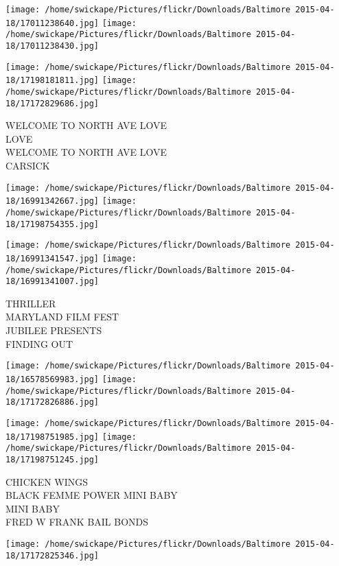 \documentclass[10pt,letterpaper]{article}
\begin{document}
\texttt{[image: /home/swickape/Pictures/flickr/Downloads/Baltimore 2015-04-18/17011238640.jpg]}
\texttt{[image: /home/swickape/Pictures/flickr/Downloads/Baltimore 2015-04-18/17011238430.jpg]}

\texttt{[image: /home/swickape/Pictures/flickr/Downloads/Baltimore 2015-04-18/17198181811.jpg]}
\texttt{[image: /home/swickape/Pictures/flickr/Downloads/Baltimore 2015-04-18/17172829686.jpg]}

WELCOME TO NORTH AVE LOVE\\
LOVE\\
WELCOME TO NORTH AVE LOVE\\
CARSICK\\
\pagebreak

\texttt{[image: /home/swickape/Pictures/flickr/Downloads/Baltimore 2015-04-18/16991342667.jpg]}
\texttt{[image: /home/swickape/Pictures/flickr/Downloads/Baltimore 2015-04-18/17198754355.jpg]}

\texttt{[image: /home/swickape/Pictures/flickr/Downloads/Baltimore 2015-04-18/16991341547.jpg]}
\texttt{[image: /home/swickape/Pictures/flickr/Downloads/Baltimore 2015-04-18/16991341007.jpg]}

THRILLER\\
MARYLAND FILM FEST\\
JUBILEE PRESENTS\\
FINDING OUT\\
\pagebreak

\texttt{[image: /home/swickape/Pictures/flickr/Downloads/Baltimore 2015-04-18/16578569983.jpg]}
\texttt{[image: /home/swickape/Pictures/flickr/Downloads/Baltimore 2015-04-18/17172826886.jpg]}

\texttt{[image: /home/swickape/Pictures/flickr/Downloads/Baltimore 2015-04-18/17198751985.jpg]}
\texttt{[image: /home/swickape/Pictures/flickr/Downloads/Baltimore 2015-04-18/17198751245.jpg]}

CHICKEN WINGS\\
BLACK FEMME POWER MINI BABY\\
MINI BABY\\
FRED W FRANK BAIL BONDS\\
\pagebreak

\texttt{[image: /home/swickape/Pictures/flickr/Downloads/Baltimore 2015-04-18/17172825346.jpg]}
\end{document}

